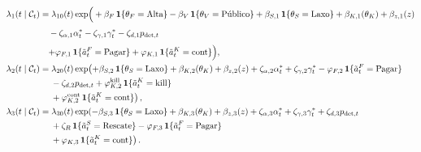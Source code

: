 \documentclass[12pt]{article}
\theoremstyle{definition}
\theoremstyle{remark}
\newcommand{\1}{\mathbf{1}}
\begin{document}
\begingroup\footnotesize
\begin{align*}
\lambda_1(t\mid\mathcal{C}_t) &= \lambda_{10}(t) \exp \Bigl(
{}+ \beta_F\,\mathbf{1}\{\theta_F=\text{Alta}\}
- \beta_V\,\mathbf{1}\{\theta_V=\text{Público}\}
+ \beta_{S,1}\,\mathbf{1}\{\theta_S=\text{Laxo}\}
+ \beta_{K,1}(\theta_K)
+ \beta_{z,1}(z)
\Bigr. \\
&\quad\Bigl.
{}- \zeta_{\alpha,1}\alpha_t^\ast - \zeta_{\gamma,1}\gamma_t^\ast - \zeta_{d,1}p_{\mathrm{det},t}
\Bigr. \\
&\quad\Bigl.
+ \varphi_{F,1}\,\mathbf{1}\{\tilde{a}_t^F=\text{Pagar}\}
+ \varphi_{K,1}\,\mathbf{1}\{\tilde{a}_t^K=\mathrm{cont}\}
\Bigr), \\
\lambda_2(t\mid\mathcal{C}_t) &= \lambda_{20}(t) \exp\!\left(
+ \beta_{S,2}\,\mathbf{1}\{\theta_S=\text{Laxo}\}
+ \beta_{K,2}(\theta_K)
+ \beta_{z,2}(z)
+ \zeta_{\alpha,2}\alpha_t^\ast + \zeta_{\gamma,2}\gamma_t^\ast
- \varphi_{F,2}\,\mathbf{1}\{\tilde{a}_t^F=\text{Pagar}\}
\right. \\
&\quad\left.{}
- \zeta_{d,2}p_{\mathrm{det},t}
+ \varphi_{K,2}^{\mathrm{kill}}\,\mathbf{1}\{\tilde{a}_t^K=\mathrm{kill}\}
\right. \\
&\quad\left.{}
+ \varphi_{K,2}^{\mathrm{cont}}\,\mathbf{1}\{\tilde{a}_t^K=\mathrm{cont}\}
\right), \\
\lambda_3(t\mid\mathcal{C}_t) &= \lambda_{30}(t) \exp\!\left(
- \beta_{S,3}\,\mathbf{1}\{\theta_S=\text{Laxo}\}
+ \beta_{K,3}(\theta_K)
+ \beta_{z,3}(z)
+ \zeta_{\alpha,3}\alpha_t^\ast + \zeta_{\gamma,3}\gamma_t^\ast + \zeta_{d,3}p_{\mathrm{det},t}
\right. \\
&\quad\left.{}
+ \zeta_{R}\,\mathbf{1}\{\tilde{a}_t^S=\text{Rescate}\}
- \varphi_{F,3}\,\mathbf{1}\{\tilde{a}_t^F=\text{Pagar}\}
\right. \\
&\quad\left.{}
+ \varphi_{K,3}\,\mathbf{1}\{\tilde{a}_t^K=\mathrm{cont}\}
\right).
\end{align*}
\endgroup
\end{document}
